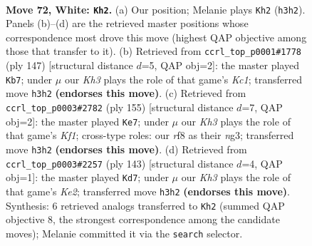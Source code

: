\documentclass[11pt]{article}
\begin{document}
\clearpage

\begin{figure}[p]\centering
\begin{subfigure}{0.46\textwidth}\centering
\resizebox{\linewidth}{!}{%
\newchessgame
\chessboard[
  setfen={5r1k/P3R3/8/8/8/7K/8/8 w - - 13 72},
  showmover=false,
  pgfstyle=straightmove, color=movearrow, markmove={h3-h2}
]}
\caption{}
\end{subfigure}\hfill
\begin{subfigure}{0.46\textwidth}\centering
\resizebox{\linewidth}{!}{%
\newchessgame
\chessboard[
  setfen={2k5/p7/8/8/8/2N5/5K1R/r7 b - - 0 74},
  showmover=false,
  pgfstyle=straightmove, color=movearrow, markmove={c8-b7}
]}
\caption{}
\end{subfigure}
\\[4pt]
\begin{subfigure}{0.46\textwidth}\centering
\resizebox{\linewidth}{!}{%
\newchessgame
\chessboard[
  setfen={5k2/8/8/1R5K/8/p5N1/8/r7 b - - 6 78},
  showmover=false,
  pgfstyle=straightmove, color=movearrow, markmove={f8-e7}
]}
\caption{}
\end{subfigure}\hfill
\begin{subfigure}{0.46\textwidth}\centering
\resizebox{\linewidth}{!}{%
\newchessgame
\chessboard[
  setfen={8/4k3/6R1/p7/8/3P4/6K1/r7 b - - 7 72},
  showmover=false,
  pgfstyle=straightmove, color=movearrow, markmove={e7-d7}
]}
\caption{}
\end{subfigure}
\caption{\textbf{Move 72, White: \texttt{Kh2}.} (a) Our position; Melanie plays \texttt{Kh2} (\texttt{h3h2}). Panels (b)--(d) are the retrieved master positions whose correspondence most drove this move (highest QAP objective among those that transfer to it). (b) Retrieved from \texttt{ccrl\_top\_p0001\#1778} (ply 147) [structural distance $d$=5, QAP obj=2]: the master played \texttt{Kb7}; under $\mu$ our \emph{Kh3} plays the role of that game's \emph{Kc1}; transferred move \texttt{h3h2} \textbf{(endorses this move)}. (c) Retrieved from \texttt{ccrl\_top\_p0003\#2782} (ply 155) [structural distance $d$=7, QAP obj=2]: the master played \texttt{Ke7}; under $\mu$ our \emph{Kh3} plays the role of that game's \emph{Kf1}; cross-type roles: our \emph{r}f8 as their \emph{n}g3; transferred move \texttt{h3h2} \textbf{(endorses this move)}. (d) Retrieved from \texttt{ccrl\_top\_p0003\#2257} (ply 143) [structural distance $d$=4, QAP obj=1]: the master played \texttt{Kd7}; under $\mu$ our \emph{Kh3} plays the role of that game's \emph{Ke2}; transferred move \texttt{h3h2} \textbf{(endorses this move)}. Synthesis: 6 retrieved analogs transferred to \texttt{Kh2} (summed QAP objective 8, the strongest correspondence among the candidate moves); Melanie committed it via the \texttt{search} selector.}
\label{fig:thought-m142}
\end{figure}
\end{document}
